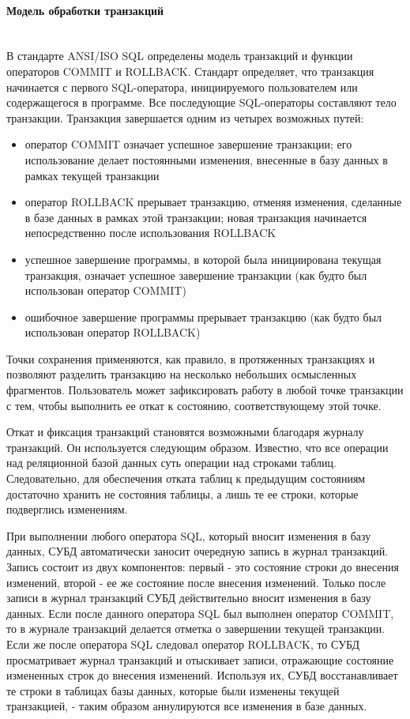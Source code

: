 \paragraph{Модель обработки транзакций} ~\\
В стандарте ANSI/ISO SQL определены модель транзакций и функции операторов COMMIT и ROLLBACK.
Стандарт определяет, что транзакция начинается с первого SQL-оператора, инициируемого пользователем или содержащегося
в программе. Все последующие SQL-операторы составляют тело транзакции. Транзакция завершается одним из четырех
возможных путей:
\begin{itemize}
    \item оператор COMMIT означает успешное завершение транзакции; его использование делает постоянными изменения,
    внесенные в базу данных в рамках текущей транзакции
    \item оператор ROLLBACK прерывает транзакцию, отменяя изменения, сделанные в базе данных в рамках
    этой транзакции; новая транзакция начинается непосредственно после использования ROLLBACK
    \item успешное завершение программы, в которой была инициирована текущая транзакция,
    означает успешное завершение транзакции (как будто был использован оператор COMMIT)
    \item ошибочное завершение программы прерывает транзакцию (как будто был использован оператор ROLLBACK)
\end{itemize}

Точки сохранения применяются, как правило, в протяженных транзакциях и позволяют разделить транзакцию на несколько
небольших осмысленных фрагментов. Пользователь может зафиксировать работу в любой точке транзакции с тем,
чтобы выполнить ее откат к состоянию, соответствующему этой точке.

Откат и фиксация транзакций становятся возможными благодаря журналу транзакций. Он используется следующим образом.
Известно, что все операции над реляционной базой данных суть операции над строками таблиц. Следовательно,
для обеспечения отката таблиц к предыдущим состояниям достаточно хранить не состояния таблицы, а лишь те
ее строки, которые подверглись изменениям.

При выполнении любого оператора SQL, который вносит изменения в базу данных, СУБД автоматически заносит
очередную запись в журнал транзакций. Запись состоит из двух компонентов: первый - это состояние строки до
внесения изменений, второй - ее же состояние после внесения изменений. Только после записи в журнал транзакций
СУБД действительно вносит изменения в базу данных. Если после данного оператора SQL был выполнен оператор
COMMIT, то в журнале транзакций делается отметка о завершении текущей транзакции. Если же после
оператора SQL следовал оператор ROLLBACK, то СУБД просматривает журнал транзакций и отыскивает записи,
отражающие состояние измененных строк до внесения изменений. Используя их, СУБД восстанавливает те
строки в таблицах базы данных, которые были изменены текущей транзакцией, - таким образом
аннулируются все изменения в базе данных.

